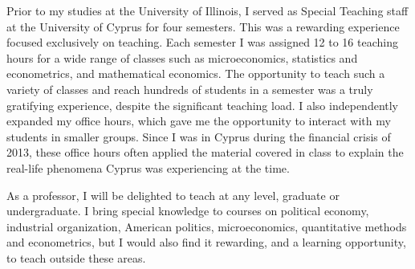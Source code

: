 \documentclass[12pt]{article}
\begin{document}
Prior to my studies at the University of Illinois, I served as Special Teaching staff at the University of Cyprus for four semesters.
This was a rewarding experience focused exclusively on teaching.
Each semester I was assigned 12 to 16 teaching hours for a wide range of classes such as microeconomics, statistics and econometrics, and mathematical economics.
The opportunity to teach such a variety of classes and reach hundreds of students in a semester was a truly gratifying experience, despite the significant  teaching load.
I also independently expanded my office hours, which gave me the opportunity to interact with my students in smaller groups.
Since I was in Cyprus during the financial crisis of 2013, these office hours often applied the material covered in class to explain the real-life phenomena Cyprus was experiencing at the time.

As a professor, I will be delighted to teach at any level, graduate or undergraduate.
I bring special knowledge to courses on political economy, industrial organization, American politics, microeconomics, quantitative methods and econometrics,
but I would also find it rewarding, and a learning opportunity, to teach outside these areas.
\end{document}
